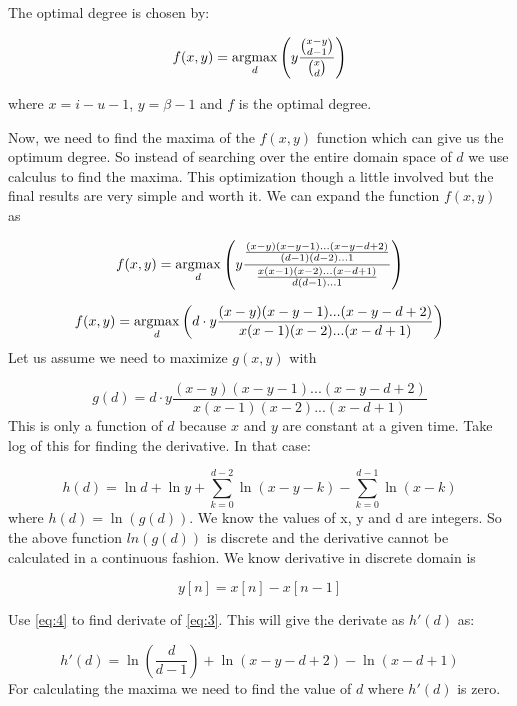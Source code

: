 The optimal degree is chosen by:

\begin{equation} \label{eq:1}
	f(x,y) = \operatorname*{argmax}_{d} \left(y\frac{\binom{x-y}{d-1}}{\binom{x}{d}}\right)
\end{equation}

where $x=i-u-1$, $y=\beta-1$ and $f$ is the optimal degree. 

Now, we need to find the maxima of the $f(x,y)$ function which can give us the optimum degree. So instead of searching over the entire domain space of $d$ we use calculus to find the maxima. This optimization though a little involved but the final results are very simple and worth it. We can expand the function $f(x,y)$ as

{\large\[
f(x,y) = \operatorname*{argmax}_{d} \left(y\frac{\frac{(x-y)(x-y-1)...(x-y-d+2)}{(d-1)(d-2)...1}}{\frac{x(x-1)(x-2)...(x-d+1)}{d(d-1)...1}}\right)
\]}


\[
f(x,y) = \operatorname*{argmax}_{d} 	\left(d\cdot y\frac{(x-y)(x-y-1)...(x-y-d+2)}{x(x-1)(x-2)...(x-d+1)}\right)
\]
\linebreak
Let us assume we need to maximize $g(x,y)$ with

\begin{equation} \label{eq:2}
	g(d) = d\cdot y\frac{(x-y)(x-y-1)...(x-y-d+2)}{x(x-1)(x-2)...(x-d+1)}
\end{equation}
This is only a function of $d$ because $x$ and $y$ are constant at a given time. Take log of this for finding the derivative. In that case:

\begin{equation} \label{eq:3}
	h(d) = \ln d + \ln y + \sum_{k=0}^{d-2}{\ln(x-y-k)} - \sum_{k=0}^{d-1}{\ln(x-k)}
\end{equation}
\linebreak
where $h(d) = \ln(g(d))$. We know the values of x, y and d are integers. So the above function $ln(g(d))$ is discrete and the derivative cannot be calculated in a continuous fashion. We know derivative in discrete domain is

\begin{equation} \label{eq:4}
	y[n] = x[n] - x[n-1]
\end{equation}

Use \ref{eq:4} to find derivate of \ref{eq:3}. This will give the derivate as $h'(d)$ as:

\begin{equation} \label{eq:5}
	h'(d) = \ln({\frac{d}{d-1}}) + \ln(x-y-d+2) - \ln(x-d+1) 	
\end{equation}
For calculating the maxima we need to find the value of $d$ where $h'(d)$ is zero.

